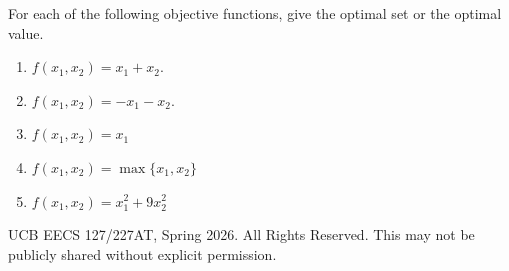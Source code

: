 \documentclass[10pt]{article}
\begin{document}
For each of the following objective functions, give the optimal set or the optimal value.

\begin{enumerate}[label=(\alph*), resume]
    \item $f(x_1, x_2) = x_1 + x_2$.

    \vspace{3cm}

    \item $f(x_1, x_2) = -x_1 - x_2$.

    \vspace{3cm}

    \item $f(x_1, x_2) = x_1$

    \vspace{3cm}

    \item $f(x_1, x_2) = \max\{x_1, x_2\}$

    \vspace{3cm}

    \item $f(x_1, x_2) = x_1^2 + 9x_2^2$
\end{enumerate}

\vfill
\noindent\textcopyright{} UCB EECS 127/227AT, Spring 2026. All Rights Reserved. This may not be publicly shared without explicit permission.
\end{document}

